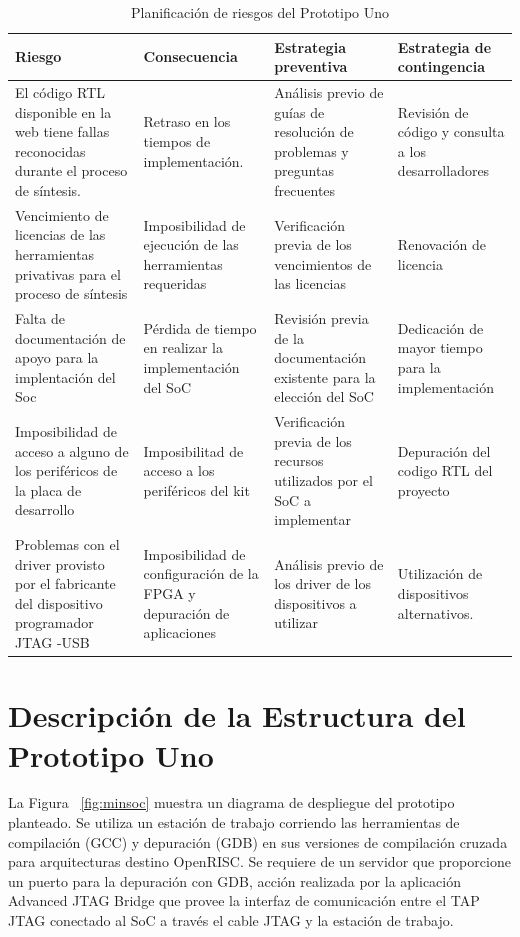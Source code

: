 		\begin{table}[h!]
		\centering
		\begin{tabular}{ p{4cm} p{4cm} p{4cm} p{3cm} }
		\hline 
		\rowcolor[gray]{0.8} Riesgo & Consecuencia & Estrategia preventiva & Estrategia de contingencia\\
		\hline
		El código RTL disponible en la web tiene fallas reconocidas durante el proceso de síntesis.&Retraso en los tiempos de implementación.& Análisis
		previo de guías de resolución de problemas y preguntas frecuentes & Revisión de código y consulta a los desarrolladores \\
		\hline
		Vencimiento de licencias de las herramientas privativas para el proceso de síntesis & Imposibilidad de ejecución de las herramientas requeridas & Verificación previa de los vencimientos de las licencias & Renovación de licencia \\	 
		\hline
		Falta de documentación de apoyo para la implentación
del Soc& Pérdida de tiempo en realizar la implementación
del SoC & Revisión previa de la documentación existente para la elección del
SoC & Dedicación de mayor tiempo para la implementación\\ 
		\hline
		 Imposibilidad de acceso a alguno de los periféricos de la placa de desarrollo & Imposibilitad de acceso a los periféricos del kit &Verificación previa de los recursos utilizados por el SoC a implementar & Depuración del codigo RTL del proyecto\\		
		\hline
		Problemas con el driver provisto por el fabricante del  dispositivo programador JTAG -USB  & Imposibilidad de configuración de la FPGA y depuración de aplicaciones &Análisis previo de los driver de los dispositivos a utilizar &  Utilización de dispositivos alternativos.\\		
		\hline
		\end{tabular}
		\caption{Planificación de riesgos del Prototipo Uno}
		\end{table}



		\newpage
		\section{Descripción de la Estructura del Prototipo Uno}
			

		La Figura ~\ref{fig:minsoc} muestra un diagrama de despliegue del prototipo planteado. Se utiliza un estación de trabajo corriendo las herramientas
		de compilación (GCC) y depuración (GDB) en sus versiones de compilación cruzada para arquitecturas destino OpenRISC. Se requiere de un servidor que
		proporcione un puerto para la depuración con GDB, acción realizada por la aplicación Advanced JTAG Bridge que provee la interfaz de comunicación
		entre el TAP JTAG conectado al SoC a través el cable JTAG y la estación de trabajo.
		
